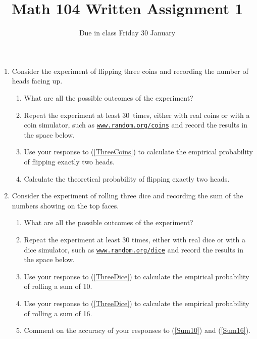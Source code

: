 \documentclass[12pt]{article}
\author{}\date{Due in class Friday 30 January}
\title{Math 104 Written Assignment 1}\author{}
\begin{document}
\maketitle
\pagestyle{empty}
\begin{enumerate}
\item Consider the experiment of flipping three coins
and recording the number of heads facing up.
\begin{enumerate}
\item What are all the possible outcomes of the experiment?
\vspace{1cm}
\item\label{ThreeCoins} Repeat the experiment at least 30~times,
either with real coins or with a coin simulator, such
as
\href{https://www.random.org/coins/?num=3&cur=60-usd.0025c-nj}{\tt www.random.org/coins}
and record the results in the space below.
\vspace{3cm}
\item Use your response to (\ref{ThreeCoins}) to calculate
the empirical probability of flipping exactly two heads.
\vspace{1cm}
\item Calculate the theoretical probability
of flipping exactly two heads.
\vspace{1cm}
\end{enumerate}

\item Consider the experiment of rolling three dice
and recording the sum of the numbers showing on the top faces.
\begin{enumerate}
\item What are all the possible outcomes of the experiment?
\vspace{1cm}
\item\label{ThreeDice} Repeat the experiment at least 30 times,
either with real dice or with a dice simulator, such
as
\href{https://www.random.org/dice/?num=3}{\tt www.random.org/dice}
and record the results in the space below.
\vspace{3cm}
\item\label{Sum10} Use your response to (\ref{ThreeDice}) to calculate
the empirical probability of rolling a sum of 10.
\vspace{1cm}
\item\label{Sum16} Use your response to (\ref{ThreeDice}) to calculate
the empirical probability of rolling a sum of 16.
\vspace{1cm}
\item Comment on the accuracy of your responses to
(\ref{Sum10}) and (\ref{Sum16}).
\vspace{1cm}
\end{enumerate}
\end{enumerate}
\end{document}
